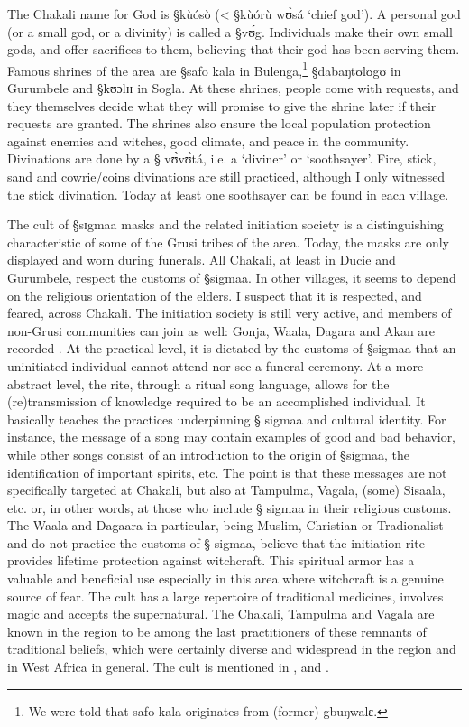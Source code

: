 The Chakali name for God is {\S kùósò} (< {\S kùórù wʊ̀sá} `chief god').
A personal god (or a small god, or a divinity)  is called a {\S vʊ́g}.
Individuals make their own small gods, and offer sacrifices to them, believing
that their  god has been serving
them.
Famous shrines of the area are {\S safo kala} in Bulenga,\footnote{We were told
that {\F safo kala} originates from (former) {\F gbuŋwalɛ}.} {\S  dabaŋtʊlʊgʊ}
in Gurumbele and {\S kʊɔlɪɪ} in Sogla. At these shrines, people come with
requests, and they themselves decide what they will promise to give the shrine
later if their requests are granted. The shrines also ensure the local
population
protection against enemies and witches,  good climate,   and peace in the
community. Divinations are done by a {\S
vʊ̀vʊ̀tá}, i.e. a `diviner' or `soothsayer'.  Fire, stick, sand and
cowrie/coins
divinations are still practiced, although I only witnessed the stick
divination. Today at least one soothsayer  can
be found in each village. 

The cult of {\S sɪgmaa}  masks and the related initiation
society is a distinguishing characteristic of some of the Grusi tribes of the
area. Today, the
masks are only displayed and worn during  funerals.  All
Chakali, at least in Ducie and Gurumbele,  respect the customs of {\S sigmaa}.
In other villages,  it seems to depend on the religious orientation of the
elders. I suspect that it is respected, and feared, across Chakali. The
initiation
society is still very active, and members of non-Grusi
communities  can join as well: Gonja, Waala, 
Dagara and  Akan are  recorded  \citep{Brin09b}.  At the
practical level, it is dictated by the customs of {\S sigmaa} that  an
uninitiated individual cannot attend nor see a funeral ceremony. At a more
abstract level,  the rite, through a ritual  song language,  allows
for the
(re)transmission of knowledge  required to be an accomplished  
individual.  It basically teaches the practices underpinning {\S
sigmaa} and  cultural identity.  For instance, the message of a song may contain
examples
of good and bad behavior, while other songs consist of  an introduction to  the
origin of {\S sigmaa}, the identification of important spirits, etc. The point
is that these messages are not specifically targeted at Chakali, but  also  at
Tampulma, Vagala, (some) Sisaala, etc.   or,  in other words, at those who
include  {\S
sigmaa} in their religious customs.  The Waala and Dagaara in particular, being
Muslim, Christian or Tradionalist and  do not practice  the customs of  {\S
sigmaa},
believe
that the initiation rite provides  lifetime protection against witchcraft. This
spiritual armor has a valuable and beneficial use  especially in this area
where witchcraft is a genuine source of fear. The cult has a large repertoire of
traditional medicines, involves magic and accepts the supernatural. The Chakali,
Tampulma and Vagala are known in the region to be among the last practitioners
of
these remnants of
traditional beliefs, which were certainly diverse and  widespread in the
region
and in  West Africa in general. The cult is mentioned in
\citet[5-6, 56-58]{Brav74}, \citet[95-96]{Doug66} and \cite{Popp93}.


